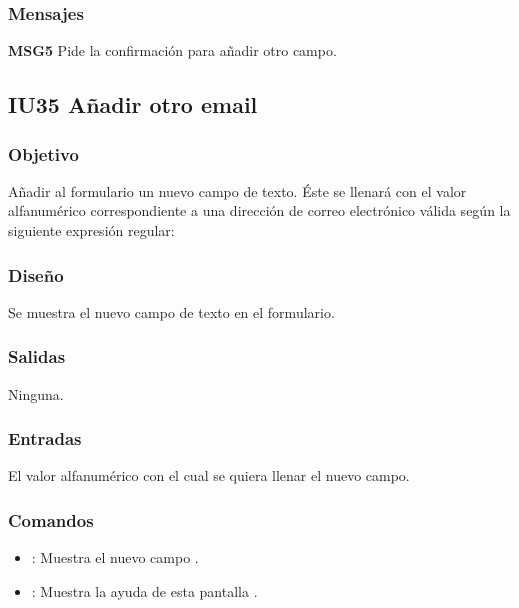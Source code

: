 \subsubsection{Mensajes}
	\begin{Citemize}
		\item {\bf MSG5} Pide la confirmación para añadir otro campo.
	\end{Citemize}
	

\subsection{IU35 Añadir otro email}

\subsubsection{Objetivo}
	Añadir al formulario un nuevo campo de texto. Éste se llenará con el valor alfanumérico correspondiente a una dirección de correo electrónico válida según la siguiente expresión regular: %

\subsubsection{Diseño}
	Se muestra el nuevo campo de texto en el formulario.


\subsubsection{Salidas}

	Ninguna.

\subsubsection{Entradas}
	El valor alfanumérico con el cual se quiera llenar el nuevo campo. 

\subsubsection{Comandos}
\begin{itemize}
	\item {}: Muestra el nuevo campo .
	\item {}: Muestra la ayuda de esta pantalla .
\end{itemize}

